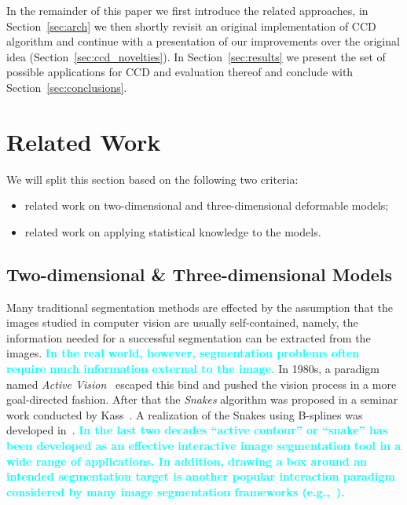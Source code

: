 \documentclass[conference]{IEEEtran}
\newcommand{\review}[1]{\textbf{\textcolor{cyan}{#1}}}
\begin{document}
In the remainder of this paper we first introduce the related approaches, 
in Section~\ref{sec:arch} we then shortly revisit an original implementation of 
CCD algorithm and continue with a presentation of our improvements over the
original idea (Section~\ref{sec:ccd_novelties}). In Section~\ref{sec:results}
we present the set of possible applications for CCD and evaluation thereof and
conclude with Section~\ref{sec:conclusions}.

\section{Related Work}
\label{sec:rw}
We will split this section based on the following two criteria:
\begin{itemize}
\item related work on two-dimensional and three-dimensional deformable models;
\item related work on applying statistical knowledge to the models.
\end{itemize}
\subsection{Two-dimensional \& Three-dimensional Models}
\label{sec:23m}
Many traditional segmentation methods are effected by the assumption that the
images studied in computer vision are usually self-contained, namely,
the information needed for a successful segmentation can be extracted
from the images. \review{In the real world, however, segmentation problems often require much
information external to the image.} In 1980s, a paradigm named \textit{Active Vision}~\cite{aloimonos1988active} 
escaped this bind and pushed the vision process in a more goal-directed fashion. 
After that the \textit{Snakes} algorithm was proposed in a seminar work conducted 
by Kass~\cite{kass1988snakes}. %
A realization of the Snakes using B-splines was developed
in~\cite{brigger2000b}. \review{In the last two decades ``active contour'' or
``snake'' has been developed as an effective interactive image segmentation tool
in a wide range of applications. In addition, drawing a box around an intended
segmentation target is another popular interaction paradigm considered
by many image segmentation frameworks
(e.g.,~\cite{lempitsky2009image,gradysegmentation,santner2011interactive}).}
\end{document}
